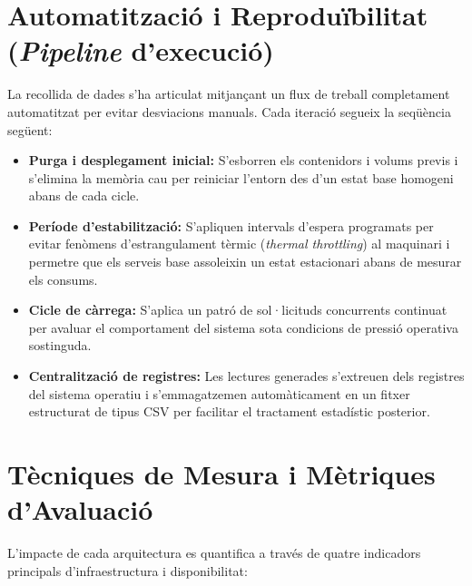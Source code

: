 \section{Automatització i Reproduïbilitat (\textit{Pipeline} d'execució)}
La recollida de dades s'ha articulat mitjançant un flux de treball completament automatitzat per evitar desviacions manuals. Cada iteració segueix la seqüència següent:

\begin{itemize}
    \item \textbf{Purga i desplegament inicial:} S'esborren els contenidors i volums previs i s'elimina la memòria cau per reiniciar l'entorn des d'un estat base homogeni abans de cada cicle.
    \item \textbf{Període d'estabilització:} S'apliquen intervals d'espera programats per evitar fenòmens d'estrangulament tèrmic (\textit{thermal throttling}) al maquinari i permetre que els serveis base assoleixin un estat estacionari abans de mesurar els consums.
    \item \textbf{Cicle de càrrega:} S'aplica un patró de sol·licituds concurrents continuat per avaluar el comportament del sistema sota condicions de pressió operativa sostinguda.
    \item \textbf{Centralització de registres:} Les lectures generades s'extreuen dels registres del sistema operatiu i s'emmagatzemen automàticament en un fitxer estructurat de tipus CSV per facilitar el tractament estadístic posterior.
\end{itemize}

\section{Tècniques de Mesura i Mètriques d'Avaluació}
\label{subsec:metriques_avaluacio}
L'impacte de cada arquitectura es quantifica a través de quatre indicadors principals d'infraestructura i disponibilitat:

